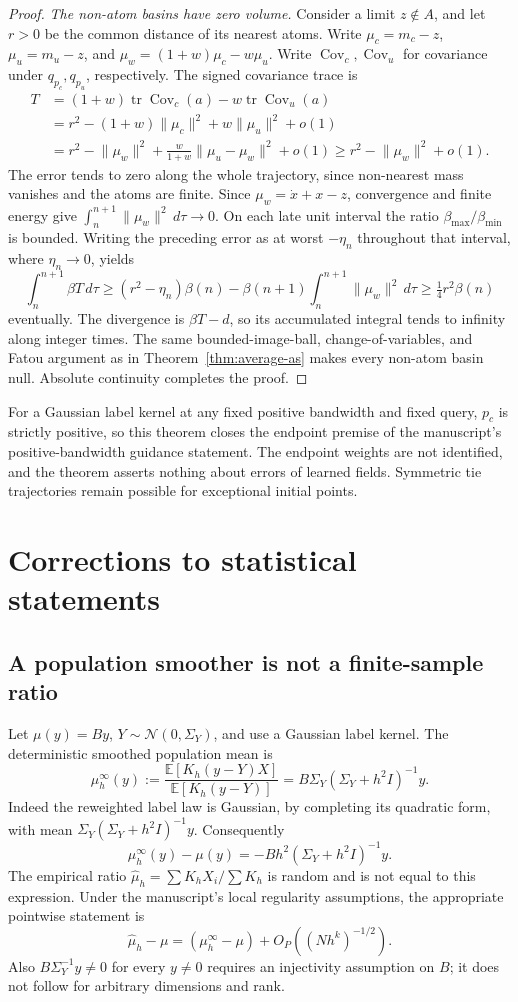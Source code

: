 \documentclass[11pt]{article}
\newcommand{\E}{\mathbb E}
\newcommand{\Cov}{\operatorname{Cov}}
\begin{document}
\begin{proof}
\emph{The non-atom basins have zero volume.}
Consider a limit $z\notin A$, and let $r>0$ be the common distance of its nearest
atoms. Write $\mu_c=m_c-z$, $\mu_u=m_u-z$, and
$\mu_w=(1+w)\mu_c-w\mu_u$. Write $\Cov_c,\Cov_u$ for covariance under
$q_{p_c},q_{p_u}$, respectively. The signed covariance trace is
\begin{align*}
T&=(1+w)\operatorname{tr}\Cov_c(a)-w\operatorname{tr}\Cov_u(a)\\
 &=r^2-(1+w)\lVert\mu_c\rVert^2+w\lVert\mu_u\rVert^2+o(1)\\
 &=r^2-\lVert\mu_w\rVert^2+
 \frac{w}{1+w}\lVert\mu_u-\mu_w\rVert^2+o(1)
 \ge r^2-\lVert\mu_w\rVert^2+o(1).
\end{align*}
The error tends to zero along the whole trajectory, since non-nearest mass
vanishes and the atoms are finite. Since $\mu_w=\dot x+x-z$, convergence and
finite energy give $\int_n^{n+1}\lVert\mu_w\rVert^2\,d\tau\to0$.
On each late unit interval the ratio $\beta_{\max}/\beta_{\min}$ is bounded.
Writing the preceding error as at worst $-\eta_n$ throughout that interval,
where $\eta_n\to0$, yields
\[
\int_n^{n+1}\beta T\,d\tau
\ge(r^2-\eta_n)\beta(n)-\beta(n+1)
\int_n^{n+1}\lVert\mu_w\rVert^2\,d\tau
\ge\tfrac14 r^2\beta(n)
\]
eventually. The divergence is $\beta T-d$, so its accumulated integral tends
to infinity along integer times. The same bounded-image-ball,
change-of-variables, and Fatou argument as in Theorem~\ref{thm:average-as}
makes every non-atom basin null. Absolute continuity completes the proof.
\end{proof}
For a Gaussian label kernel at any fixed positive bandwidth and fixed query,
$p_c$ is strictly positive, so this theorem closes the endpoint premise of
the manuscript's positive-bandwidth guidance statement. The endpoint weights
are not identified, and the theorem asserts nothing about errors of learned
fields. Symmetric tie trajectories remain possible for exceptional initial
points.

\section{Corrections to statistical statements}
\subsection{A population smoother is not a finite-sample ratio}
Let $\mu(y)=By$, $Y\sim\mathcal N(0,\Sigma_Y)$, and use a Gaussian label kernel.
The deterministic smoothed population mean is
\[
\mu_h^\infty(y):=\frac{\E[K_h(y-Y)X]}{\E[K_h(y-Y)]}
=B\Sigma_Y(\Sigma_Y+h^2I)^{-1}y.
\]
Indeed the reweighted label law is Gaussian, by completing its quadratic form,
with mean $\Sigma_Y(\Sigma_Y+h^2I)^{-1}y$. Consequently
\[
\mu_h^\infty(y)-\mu(y)=-Bh^2(\Sigma_Y+h^2I)^{-1}y.
\]
The empirical ratio $\widehat\mu_h=\sum K_hX_i/\sum K_h$ is random and is not
equal to this expression. Under the manuscript's local regularity assumptions,
the appropriate pointwise statement is
\[
\widehat\mu_h-\mu=(\mu_h^\infty-\mu)+O_P((Nh^k)^{-1/2}).
\]
Also $B\Sigma_Y^{-1}y\ne0$ for every $y\ne0$ requires an injectivity
assumption on $B$; it does not follow for arbitrary dimensions and rank.
\end{document}
